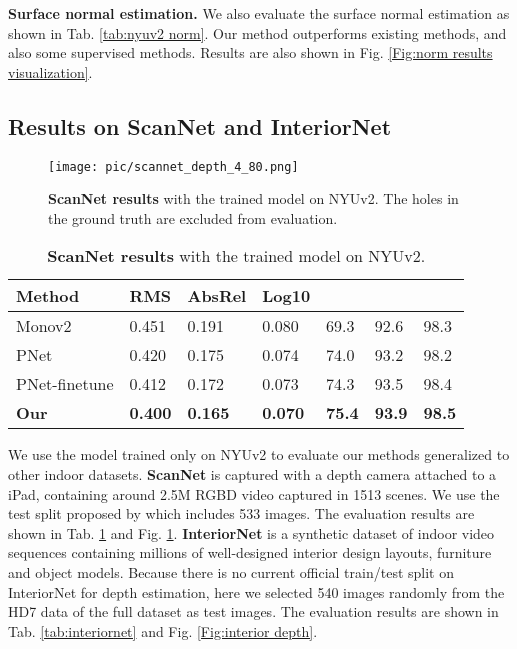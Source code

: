 \documentclass[10pt,twocolumn,letterpaper]{article}
\newcommand{\Fig}[1]{Fig. \ref{#1}}
\newcommand{\Tab}[1]{Tab. \ref{#1}}
\begin{document}
\textbf{Surface normal estimation.} We also evaluate the surface normal estimation as shown in \Tab{tab:nyuv2 norm}. Our method  outperforms existing methods, and also some supervised methods\cite{fouhey2013data,qi2018geonet,fu2018deep}. Results are also shown in \Fig{Fig:norm results visualization}.	

\subsection{Results on ScanNet and InteriorNet}


\begin{figure}[ht]
	\centering
	\texttt{[image: pic/scannet\_depth\_4\_80.png]} \caption{\textbf{ScanNet results} with the trained model on NYUv2. The holes in the ground truth are excluded from evaluation.} \label{Fig:scannet depth}
\end{figure}
\begin{table}[h]
	\scriptsize                                                                                    
\centering
	\begin{tabularx}{0.48\textwidth}{|l|XXX|XXX|}
		\hline
		Method & RMS & AbsRel & Log10 &  &  &  \\
		\hline
		Monov2\cite{godard2019digging} & 0.451 & 0.191   & 0.080 & 69.3  & 92.6  & 98.3 \\
		
		PNet \cite{yu2020p} & 0.420  & 0.175 & 0.074 & 74.0    & 93.2  & 98.2 \\
		
		PNet-finetune & 0.412  & 0.172 & 0.073 & 74.3    & 93.5  & 98.4 \\
		
\textbf{Our}   & \textbf{0.400} & \textbf{0.165} & \textbf{0.070} & \textbf{75.4}  & \textbf{93.9}  & \textbf{98.5} \\
		\hline
	\end{tabularx}\newline
	\caption{\textbf{ScanNet results} with the trained model on NYUv2.}
	\label{tab:scannet}
\end{table}

We use the model trained only on NYUv2 to evaluate our methods generalized to other indoor datasets.
\textbf{ScanNet}\cite{dai2017scannet} is captured with a depth camera attached to a iPad, containing around 2.5M RGBD video captured in 1513 scenes. We use the test split proposed by \cite{yu2020p} which includes 533 images. The evaluation results are shown in \Tab{tab:scannet} and \Fig{Fig:scannet depth}.
\textbf{InteriorNet}\cite{li2018interiornet} is a synthetic dataset of indoor video sequences containing millions of well-designed interior design layouts, furniture and object models. Because there is no current official train/test split on InteriorNet for depth estimation, here we selected 540 images randomly from the HD7 data of the full dataset as test images. The evaluation results are shown in \Tab{tab:interiornet} and \Fig{Fig:interior depth}.
\end{document}
